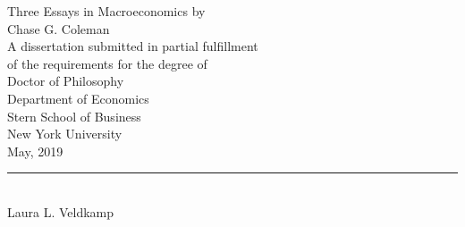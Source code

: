 \documentclass[12pt,letterpaper,oneside,final]{memoir}
\begin{document}
\fussy
{} %
\frontmatter
\hyphenation{}

\DoubleSpacing

\begin{center}


\thispagestyle{empty}
\vspace*{15mm} Three Essays in Macroeconomics
\vspace{20mm}
by\\
\vspace{10mm}
Chase G. Coleman \\
\vspace{10mm}
A dissertation submitted in partial fulfillment\\
of the requirements for the degree of\\
Doctor of Philosophy\\
Department of Economics\\
Stern School of Business\\
New York University\\
May, 2019
\end{center}
\vspace{20mm}
\begin{flushright}
{\rule[0pt]{60mm}{0.1mm}}\\ %
Laura L. Veldkamp\\
\vspace{7.5mm}
\end{flushright}

\newpage




%
%

\end{document}
